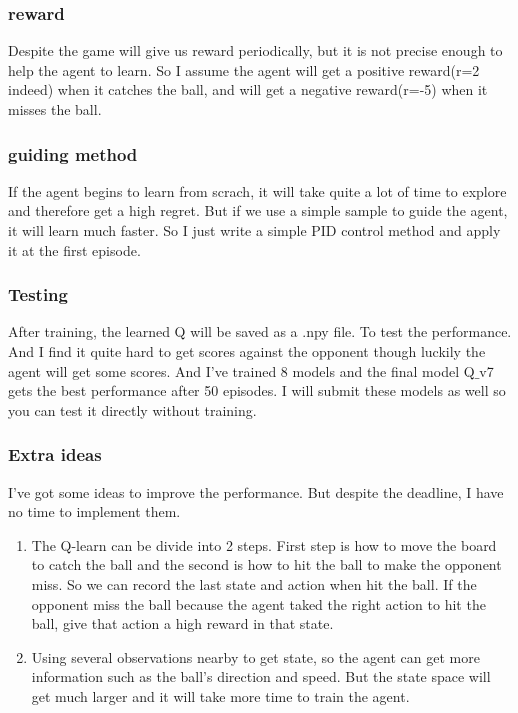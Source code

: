 \documentclass[aps,letterpaper,10pt]{revtex4}
\begin{document}
\subsubsection{reward}
Despite the game will give us reward periodically, but it is not 
precise enough to help the agent to learn. So I assume the agent will get a positive reward(r=2 indeed) when it catches the ball, and will get a negative reward(r=-5) when it misses the ball.
\subsubsection{guiding method}
If the agent begins to learn from scrach, it will take quite a lot of time to explore and therefore get a high regret. But if we use a simple sample to guide the agent, it will learn much faster. 
So I just write a simple PID control method and apply it at the first episode. 
\subsubsection{Testing}
After training, the learned Q will be saved as a .npy file. To test the performance. And I find it quite hard to get scores against the opponent though luckily the agent will get some scores.
And I've trained 8 models and the final model Q$\_$v7 gets the best performance after 50 episodes. I will submit these models as well so you can test it directly without training.
\subsubsection{Extra ideas}
I've got some ideas to improve the performance. But despite the deadline, I have no time to implement them.
\begin{enumerate}
    \item The Q-learn can be divide into 2 steps. First step is how to move the board to catch the ball and the second is how to hit the ball to make the opponent miss. 
    So we can record the last state and action when hit the ball. If the opponent miss the ball because the agent taked the right action to hit the ball, give that action a high reward in that state. 
    \item Using several observations nearby to get state, so the agent can get more information such as the ball's direction and speed. But the state space will get much larger and it will take more time to train the agent. 
\end{enumerate}
\end{document}
